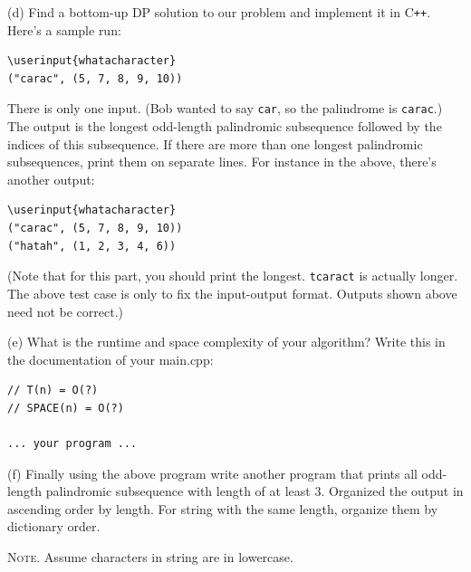 (d)
Find a bottom-up DP solution to our problem
and implement it in C\texttt{++}.
Here's a sample run:
\begin{Verbatim}[frame=single,commandchars=\\\{\}]
\userinput{whatacharacter}
("carac", (5, 7, 8, 9, 10))
\end{Verbatim}
There is only one input. (Bob wanted to say \verb!car!, so the palindrome is \verb!carac!.)
The output is the longest odd-length palindromic subsequence followed by the
indices of this subsequence.
If there are more than one longest palindromic subsequences,
print them on separate lines.
For instance in the above, there's another output:
\begin{Verbatim}[frame=single,commandchars=\\\{\}]
\userinput{whatacharacter}
("carac", (5, 7, 8, 9, 10))
("hatah", (1, 2, 3, 4, 6))
\end{Verbatim}
(Note that for this part, you should print the longest.
\verb!tcaract! is actually longer. The above test case
is only to fix the input-output format. Outputs shown above need not be correct.)

(e) What is the runtime and space complexity of your algorithm?
Write this in the documentation of your main.cpp:
\begin{Verbatim}[frame=single,fontsize=\small]
// T(n) = O(?)
// SPACE(n) = O(?)

... your program ...
\end{Verbatim}

(f) Finally using the above program
write another program that prints all odd-length palindromic subsequence
with length of at least 3.
Organized the output in ascending order by length.
For string with the same length, organize them by dictionary order.

\textsc{Note.}
Assume characters in string are in lowercase.
